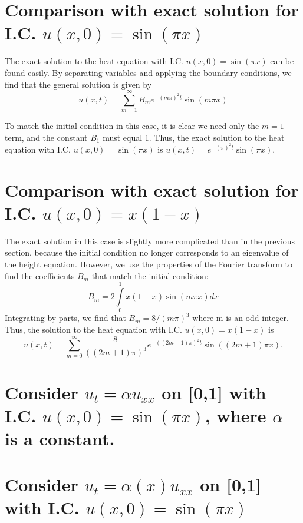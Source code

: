\documentclass[11pt]{amsart}
\begin{document}
\section{Comparison with exact solution for  I.C. $u(x,0)= \sin(\pi x)$} 

The exact solution to the heat equation with  I.C. $u(x,0)= \sin(\pi x)$ can be found easily. By separating variables and applying the boundary conditions, we find that the general solution is given by 
\begin{equation}
u(x,t) =   \sum\limits_{m = 1}^{\infty} B_m e^{-(m \pi)^2 t} \sin (m \pi x)   
\end{equation}\label{gensol}  

To match the initial condition in this case, it is clear we need only  the $m=1$ term, and the constant $B_1$ must equal 1. Thus, the exact solution to the heat equation with I.C. $u(x,0)= \sin(\pi x)$ is $u(x,t) =  e^{-(\pi)^2 t} \sin (\pi x)$.  


\section{Comparison with exact solution for  I.C. $u(x,0)= x(1-x)$} 

The exact solution in this case is slightly more complicated than in the previous section, because the initial condition no longer corresponds to an eigenvalue of the height equation. However,  we use the properties of the Fourier transform to find the coefficients $B_m$ that match the initial condition: 
\begin{equation} 
B_m = 2 \int\limits_0^1  x(1-x) \sin(m \pi x) dx 
\end{equation} 
Integrating by parts, we find that $B_m = 8/(m \pi)^3$ where m is an odd integer.  
Thus, the solution to the heat equation with I.C. $u(x,0)= x(1-x)$ is
\begin{equation} 
 u(x,t) = \sum\limits_{m=0}^{\infty} \frac{8}{((2m+1)\pi)^3} e^{-((2m+1)\pi)^2 t} \sin ((2m+1)\pi x).
 \end{equation} 
 
\section{Consider $u_t = \alpha u_{xx}$ on [0,1] with I.C. $u(x,0)= \sin(\pi x)$, where $\alpha$ is a constant. }


\section{Consider $u_t = \alpha(x) u_{xx}$ on [0,1] with I.C. $u(x,0)= \sin(\pi x)$ }
\end{document}
